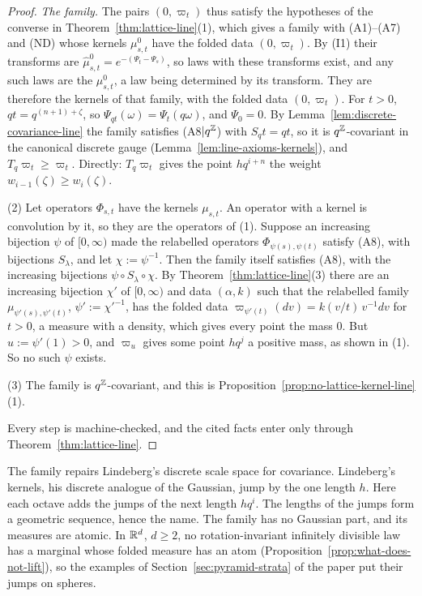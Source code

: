 \begin{proof}
\emph{The family.} The pairs $(0, \varpi_t)$ thus satisfy the hypotheses of the converse in
Theorem~\ref{thm:lattice-line}(1), which gives a family with (A1)--(A7) and (ND) whose kernels
$\mu^0_{s,t}$ have the folded data $(0, \varpi_t)$. By (I1) their transforms are
$\widehat\mu^0_{s,t} = e^{-(\Psi_t - \Psi_s)}$, so laws with these transforms exist, and any such laws
are the $\mu^0_{s,t}$, a law being determined by its transform. They are therefore the kernels of
that family, with the folded data $(0, \varpi_t)$. For $t > 0$, $qt = q^{(n+1)+\zeta}$, so
$\Psi_{qt}(\omega) = \Psi_t(q\omega)$, and $\Psi_0 = 0$. By Lemma~\ref{lem:discrete-covariance-line}
the family satisfies (A8$|q^{\mathbb{Z}}$) with $S_qt = qt$, so it is $q^{\mathbb{Z}}$-covariant in the canonical
discrete gauge (Lemma~\ref{lem:line-axioms-kernels}), and $T_q\varpi_t \ge \varpi_t$. Directly:
$T_q\varpi_t$ gives the point $hq^{i+n}$ the weight $w_{i-1}(\zeta) \ge w_i(\zeta)$.

(2) Let operators $\Phi_{s,t}$ have the kernels $\mu_{s,t}$. An operator with a kernel is
convolution by it, so they are the operators of (1). Suppose an increasing bijection $\psi$ of
$[0,\infty)$ made the relabelled operators $\Phi_{\psi(s),\psi(t)}$ satisfy (A8), with bijections
$S_\lambda$, and let $\chi := \psi^{-1}$. Then the family itself satisfies (A8), with the increasing
bijections $\psi \circ S_\lambda \circ \chi$. By Theorem~\ref{thm:lattice-line}(3) there are an
increasing bijection $\chi'$ of $[0,\infty)$ and data $(\alpha, k)$ such that the relabelled family
$\mu_{\psi'(s),\psi'(t)}$, $\psi' := \chi'^{-1}$, has the folded data $\varpi_{\psi'(t)}(dv) =
k(v/t)\,v^{-1}dv$ for $t > 0$, a measure with a density, which gives every point the mass $0$. But
$u := \psi'(1) > 0$, and $\varpi_u$ gives some point $hq^j$ a positive mass, as shown in (1). So no
such $\psi$ exists.

(3) The family is $q^{\mathbb{Z}}$-covariant, and this is
Proposition~\ref{prop:no-lattice-kernel-line}(1).

Every step is machine-checked, and the cited facts enter only through
Theorem~\ref{thm:lattice-line}.
\end{proof}

The family repairs Lindeberg's discrete scale space for covariance. Lindeberg's kernels, his
discrete analogue of the Gaussian, jump by the one length $h$. Here each octave adds the jumps of
the next length $hq^i$. The lengths of the jumps form a geometric sequence, hence the name. The
family has no Gaussian part, and its \Levy{}
measures are atomic. In $\mathbb{R}^d$, $d \ge 2$, no rotation-invariant infinitely divisible law has a
marginal whose folded \Levy{} measure has an atom (Proposition~\ref{prop:what-does-not-lift}), so
the examples of Section~\ref{sec:pyramid-strata} of the paper put their jumps on spheres.

